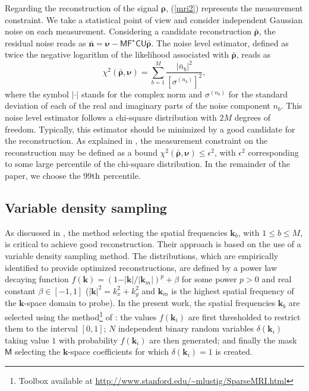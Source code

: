 \documentclass[10pt,draftcls, onecolumn]{IEEEtran}
\begin{document}
Regarding the reconstruction of the signal $\bm{\rho}$, (\ref{mri2}) represents the measurement constraint. We take a statistical point of view and consider independent Gaussian noise on each measurement. Considering a candidate reconstruction $\bar{\bm{\rho}}$, the residual noise reads as $\bar{\bm{n}}=\bm{\nu}-\mathsf{MF^{\star}CU}\bar{\bm{\rho}}$. The noise level estimator, defined as twice the negative logarithm of the likelihood associated with $\bar{\bm{\rho}}$, reads as
\begin{equation}
\label{mri3}
\chi^{2}\left(\bar{\bm{\rho}},\bm{\nu}\right)=\sum_{b=1}^{M}\frac{\vert\bar{n}_{b}\vert^2}{[\sigma^{(n_b)}]^2},
\end{equation}
where the symbol $\vert\cdot\vert$ stands for the complex norm and $\sigma^{(n_b)}$ for the standard deviation of each of the real and imaginary parts of the noise component $n_b$. This noise level estimator follows a chi-square distribution with $2M$ degrees of freedom. Typically, this estimator should be minimized by a good candidate for the reconstruction. As explained in \cite{candes06b}, the measurement constraint on the reconstruction may be defined as a bound $\chi^{2}(\bar{\bm{\rho}},\bm{\nu})\leq\epsilon^{2}$, with $\epsilon^{2}$ corresponding to some large percentile of the chi-square distribution. In the remainder of the paper, we choose the 99$\rm th$ percentile.

\subsection{Variable density sampling}
\label{sub:vds}

As discussed in \cite{lustig07}, the method selecting the spatial frequencies $\bm{k}_b$, with $1 \leq b \leq M$, is critical to achieve good reconstruction. Their approach is based on the use of a variable density sampling method. The distributions, which are empirically identified to provide optimized reconstructions, are defined by a power law decaying function $f (\bm{k}) = (1- \vert \bm{k}\vert/\vert\bm{k}_{m}\vert)^p + \beta$ for some power $p > 0$ and real constant $\beta \in [-1, 1]$ ($\vert \bm{k} \vert^2 = k_x^2+k_y^2$ and $\bm{k}_{m}$ is the highest spatial frequency of the $\bm{k}$-space domain to probe). In the present work, the spatial frequencies $\bm{k}_b$ are selected using the method\footnote{Toolbox available at \url{http://www.stanford.edu/~mlustig/SparseMRI.html}} of \cite{lustig07}: the values $f(\bm{k}_i)$ are first thresholded to restrict them to the interval $[0, 1]$; $N$ independent binary random variables $\delta \left(\bm{k}_i\right)$ taking value $1$ with probability $f \left(\bm{k}_i\right)$ are then generated; and finally the mask $\mathsf{M}$ selecting the $\bm{k}$-space coefficients for which $\delta \left(\bm{k}_i\right) = 1$ is created. 
\end{document}
